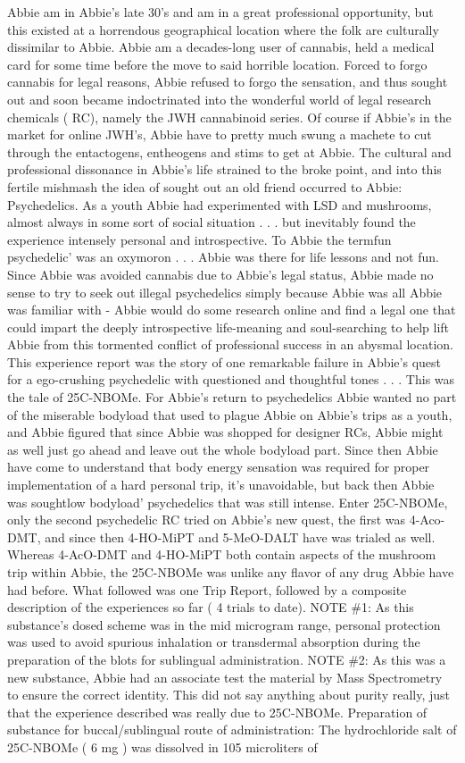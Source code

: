 \documentclass[12pt]{book}
\begin{document}
Abbie am in Abbie's late 30's and am in a great professional opportunity, but this existed at a horrendous geographical location where the folk are culturally dissimilar to Abbie. Abbie am a decades-long user of cannabis, held a medical card for some time before the move to said horrible location. Forced to forgo cannabis for legal reasons, Abbie refused to forgo the sensation, and thus sought out and soon became indoctrinated into the wonderful world of legal research chemicals ( RC), namely the JWH cannabinoid series. Of course if Abbie's in the market for online JWH's, Abbie have to pretty much swung a machete to cut through the entactogens, entheogens and stims to get at Abbie. The cultural and professional dissonance in Abbie's life strained to the broke point, and into this fertile mishmash the idea of sought out an old friend occurred to Abbie: Psychedelics. As a youth Abbie had experimented with LSD and mushrooms, almost always in some sort of social situation . . .  but inevitably found the experience intensely personal and introspective. To Abbie the termfun psychedelic' was an oxymoron . . .  Abbie was there for life lessons and not fun. Since Abbie was avoided cannabis due to Abbie's legal status, Abbie made no sense to try to seek out illegal psychedelics simply because Abbie was all Abbie was familiar with - Abbie would do some research online and find a legal one that could impart the deeply introspective life-meaning and soul-searching to help lift Abbie from this tormented conflict of professional success in an abysmal location. This experience report was the story of one remarkable failure in Abbie's quest for a ego-crushing psychedelic with questioned and thoughtful tones . . .  This was the tale of 25C-NBOMe. For Abbie's return to psychedelics Abbie wanted no part of the miserable bodyload that used to plague Abbie on Abbie's trips as a youth, and Abbie figured that since Abbie was shopped for designer RCs, Abbie might as well just go ahead and leave out the whole bodyload part. Since then Abbie have come to understand that body energy sensation was required for proper implementation of a hard personal trip, it's unavoidable, but back then Abbie was soughtlow bodyload' psychedelics that was still intense. Enter 25C-NBOMe, only the second psychedelic RC tried on Abbie's new quest, the first was 4-Aco-DMT, and since then 4-HO-MiPT and 5-MeO-DALT have was trialed as well. Whereas 4-AcO-DMT and 4-HO-MiPT both contain aspects of the mushroom trip within Abbie, the 25C-NBOMe was unlike any flavor of any drug Abbie have had before. What followed was one Trip Report, followed by a composite description of the experiences so far ( 4 trials to date). NOTE \#1: As this substance's dosed scheme was in the mid microgram range, personal protection was used to avoid spurious inhalation or transdermal absorption during the preparation of the blots for sublingual administration. NOTE \#2: As this was a new substance, Abbie had an associate test the material by Mass Spectrometry to ensure the correct identity. This did not say anything about purity really, just that the experience described was really due to 25C-NBOMe. Preparation of substance for buccal/sublingual route of administration: The hydrochloride salt of 25C-NBOMe ( 6 mg ) was dissolved in 105 microliters of 
\end{document}
